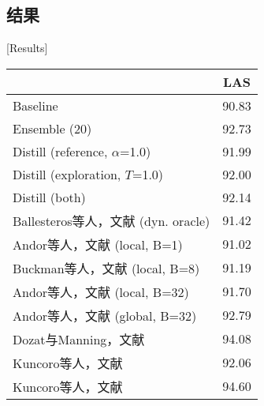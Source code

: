 \subsection{结果}[Results]\label{sec:distill:exp-res}

\begin{table}[t]
	\vspace{0.5em}\centering\wuhao
	\begin{tabular}{lc}
		\toprule[1.5pt]
		& LAS \\
		\midrule[1pt]
		Baseline & 90.83  \\
		Ensemble (20) & 92.73 \\
		Distill (reference, $\alpha$=1.0) & 91.99 \\
		Distill (exploration, $T$=1.0) & 92.00 \\
		Distill (both) & 92.14 \\
		\midrule[0.5pt]
		Ballesteros等人，文献\inlinecite{ballesteros-EtAl:2016:EMNLP2016}  (dyn. oracle) & 91.42 \\
		Andor等人，文献\inlinecite{andor-EtAl:2016:P16-1} (local, B=1) & 91.02 \\
		\midrule[0.5pt]
		Buckman等人，文献\inlinecite{buckman-ballesteros-dyer:2016:EMNLP2016} (local, B=8) & 91.19 \\
		Andor等人，文献\inlinecite{andor-EtAl:2016:P16-1} (local, B=32) & 91.70 \\
		Andor等人，文献\inlinecite{andor-EtAl:2016:P16-1} (global, B=32) & 92.79 \\
		Dozat与Manning，文献\inlinecite{DBLP:journals/corr/DozatM16} & 94.08 \\
		Kuncoro等人，文献\inlinecite{kuncoro-16} & 92.06 \\
		Kuncoro等人，文献\inlinecite{kuncoro-17} & 94.60 \\
		\bottomrule[1.5pt]
	\end{tabular}
\end{table}


